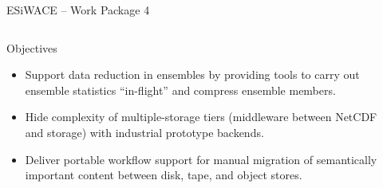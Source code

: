 \documentclass[compress,11pt,xcolor=svgnames,aspectratio=169]{beamer}
\begin{document}
\begin{frame}[fragile]{ESiWACE -- Work Package 4}

\begin{columns}

\begin{column}{0.7\textwidth}

\begin{block}{Objectives}
\begin{itemize}
\setlength\itemsep{0.5cm}
  \item Support data reduction in ensembles by providing tools to carry out ensemble statistics ``in-flight'' and compress ensemble members.
  \item Hide complexity of multiple-storage tiers (middleware between NetCDF and storage) with industrial prototype backends.
  \item Deliver portable workflow support for manual migration of semantically important content between disk, tape, and object stores.
\end{itemize}
\end{block}

\end{column}

\begin{column}{0.3\textwidth}
\begin{center}
\end{center}
\end{column}

\end{columns}

\end{frame}
\end{document}
